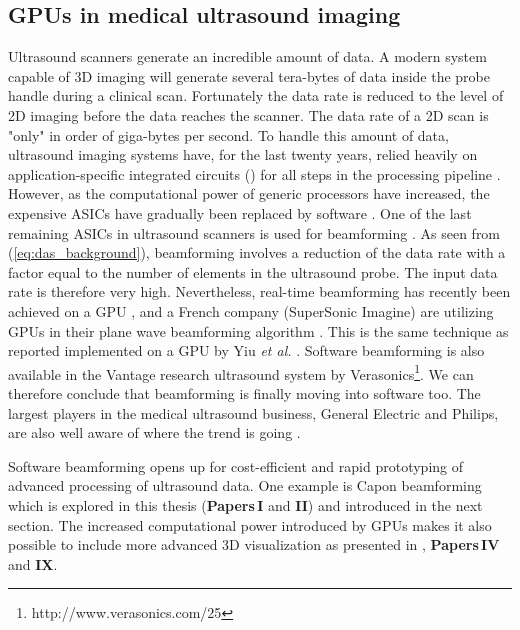 
\subsection{GPUs in medical ultrasound imaging}
Ultrasound scanners generate an incredible amount of data. A modern system capable of 3D imaging will generate several tera-bytes of data inside the probe handle during a clinical scan. Fortunately the data rate is reduced to the level of 2D imaging before the data reaches the scanner. The data rate of a 2D scan is "only" in order of giga-bytes per second. To handle this amount of data, ultrasound imaging systems have, for the last twenty years, relied heavily on application-specific integrated circuits () for all steps in the processing pipeline \cite{Thomenius}. However, as the computational power of generic processors have increased, the expensive ASICs have gradually been replaced by software \cite{Guracar2013}. One of  the last remaining ASICs in ultrasound scanners is used for beamforming \cite{Thomenius}. As seen from (\ref{eq:das_background}), beamforming involves a reduction of the data rate with a factor equal to the number of elements in the ultrasound probe. The input data rate is therefore very high. Nevertheless, real-time beamforming has recently been achieved on a GPU \cite{Song2012}, and a French company (SuperSonic Imagine) are utilizing GPUs in their plane wave beamforming algorithm \cite{Tanter2014}. This is the same technique as reported implemented on a GPU by Yiu \textit{et al.} \cite{Yiu2011}. Software beamforming is also available in the Vantage research ultrasound system by Verasonics\footnote{http://www.verasonics.com/25}. We can therefore conclude that beamforming is finally moving into software too. The largest players in the medical ultrasound business, General Electric and Philips, are also well aware of where the trend is going \cite{Thomenius2012} \cite{Metz2011}. 

Software beamforming opens up for cost-efficient and rapid prototyping of advanced processing of ultrasound data. One example is Capon beamforming which is explored in this thesis (\textbf{Papers\,I} and \textbf{II}) and introduced in the next section. The increased computational power introduced by GPUs makes it also possible to include more advanced 3D visualization as presented in \cite{solteszova2010multidirectional}, \textbf{Papers\,IV} and \textbf{IX}.

